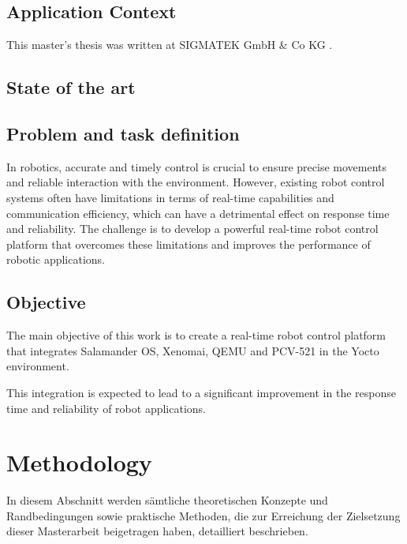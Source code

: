 \documentclass[MMR,Master,english]{twbook}
\begin{document}
\clearpage
\section{Application Context}
This master's thesis was written at SIGMATEK GmbH \& Co KG \cite{pixelartSIGMATEKKompletteAutomatisierungssysteme}.






\clearpage
\section{State of the art}







\clearpage


\section{Problem and task definition}
In robotics, accurate and timely control is crucial to ensure precise movements and reliable interaction with the environment. However, existing robot control systems often have limitations in terms of real-time capabilities and communication efficiency, which can have a detrimental effect on response time and reliability. The challenge is to develop a powerful real-time robot control platform that overcomes these limitations and improves the performance of robotic applications.


\clearpage
\section{Objective}

The main objective of this work is to create a real-time robot control platform that integrates Salamander OS, Xenomai, QEMU and PCV-521 in the Yocto environment. 

This integration is expected to lead to a significant improvement in the response time and reliability of robot applications.


\clearpage
\chapter{Methodology}
 
In diesem Abschnitt werden sämtliche theoretischen Konzepte und Randbedingungen sowie praktische Methoden, die zur Erreichung der Zielsetzung dieser Masterarbeit beigetragen haben, detailliert beschrieben.
\end{document}
